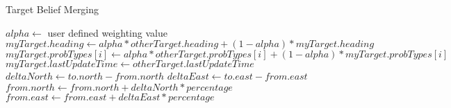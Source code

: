 \begin{algorithm}
	\caption{Target Belief Merging}
	\label{alg:mergeTarget}
	\begin{algorithmic}[1]
		\State $alpha\gets $ user defined weighting value
			\State $myTarget.heading\gets alpha * otherTarget.heading + (1-alpha)*myTarget.heading$
			\State {}
				\State $myTarget.probTypes[i]\gets alpha * otherTarget.probTypes[i] + (1-alpha)*myTarget.probTypes[i]$
			\EndFor
			\State $myTarget.lastUpdateTime\gets otherTarget.lastUpdateTime$
		\EndIf
		\EndFunction
		\\
			\State $deltaNorth\gets to.north - from.north$
			\State $deltaEast\gets to.east - from.east$
			\State $from.north\gets from.north + deltaNorth * percentage$
			\State $from.east\gets from.east + deltaEast * percentage$
		\EndFunction
	\end{algorithmic}
\end{algorithm}

